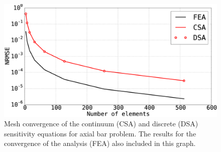 \begin{figure}[h]
	\centering
	\includegraphics[width=14.00cm]{Chapter_2/figure/axial_bar_continuum_sensitivity_analysis.eps}
	\caption{Mesh convergence of the continuum (CSA) and discrete (DSA) sensitivity equations for axial bar problem. The results for the convergence of the analysis (FEA) also included in this graph.}
	\label{fig:C2_continuumSensitivityResults}
\end{figure}